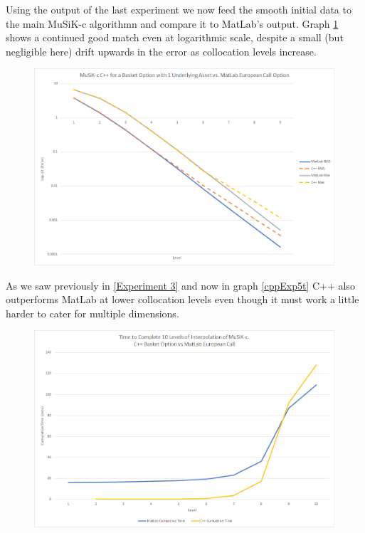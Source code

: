 \documentclass[a4paper]{amsart}
\begin{document}
Using the output of the last experiment we now feed the smooth initial data to the main MuSiK-c algorithmn and compare it to MatLab's output. Graph \ref{fig:cppExp5e} shows a continued good match even at logarithmic scale, despite a small (but negligible here) drift upwards in the error as collocation levels increase.

\begin{figure}[h]
\centering
\includegraphics[scale=0.3]{cppExp5-errors.png}
\caption {}
\label {fig:cppExp5e}
\end{figure}

As we saw previously in \ref{Experiment 3} and now in graph \ref{cppExp5t} C++ also outperforms MatLab at lower collocation levels even though it must work a little harder to cater for multiple dimensions.

\begin{figure}[h]
\centering
\includegraphics[scale=0.3]{cppExp5-time.png}
\caption {}
\label {fig:cppExp5t}
\end{figure}
\end{document}
